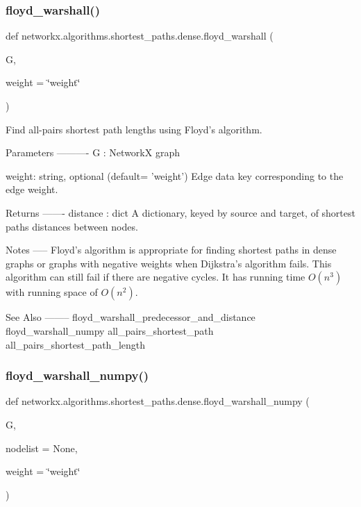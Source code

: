 \subsubsection{\texorpdfstring{floyd\+\_\+warshall()}{floyd\_warshall()}}
{\footnotesize\ttfamily def networkx.\+algorithms.\+shortest\+\_\+paths.\+dense.\+floyd\+\_\+warshall (\begin{DoxyParamCaption}\item[{}]{G,  }\item[{}]{weight = {\ttfamily \char`\"{}weight\char`\"{}} }\end{DoxyParamCaption})}

\begin{DoxyVerb}Find all-pairs shortest path lengths using Floyd's algorithm.

Parameters
----------
G : NetworkX graph

weight: string, optional (default= 'weight')
   Edge data key corresponding to the edge weight.


Returns
-------
distance : dict
   A dictionary,  keyed by source and target, of shortest paths distances
   between nodes.

Notes
-----
Floyd's algorithm is appropriate for finding shortest paths
in dense graphs or graphs with negative weights when Dijkstra's algorithm
fails.  This algorithm can still fail if there are negative cycles.
It has running time $O(n^3)$ with running space of $O(n^2)$.

See Also
--------
floyd_warshall_predecessor_and_distance
floyd_warshall_numpy
all_pairs_shortest_path
all_pairs_shortest_path_length
\end{DoxyVerb}
 \mbox{\label{namespacenetworkx_1_1algorithms_1_1shortest__paths_1_1dense_a0f0fbabf2673e685c7e349ed13c2917b}} 
\subsubsection{\texorpdfstring{floyd\+\_\+warshall\+\_\+numpy()}{floyd\_warshall\_numpy()}}
{\footnotesize\ttfamily def networkx.\+algorithms.\+shortest\+\_\+paths.\+dense.\+floyd\+\_\+warshall\+\_\+numpy (\begin{DoxyParamCaption}\item[{}]{G,  }\item[{}]{nodelist = {\ttfamily None},  }\item[{}]{weight = {\ttfamily \char`\"{}weight\char`\"{}} }\end{DoxyParamCaption})}

